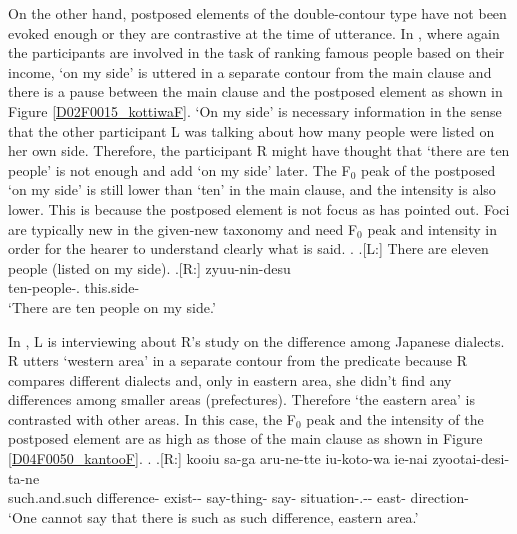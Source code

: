 On the other hand,
postposed elements of the double-contour type have not been evoked enough or they are contrastive at the time of utterance.
In \Next, where again the participants are involved in the task of ranking famous people based on their income,
 `on my side' is uttered in a separate contour from the main clause and there is a pause between the main clause and the postposed element as shown in Figure \ref{D02F0015_kottiwaF}.
`On my side' is necessary information in the sense that
the other participant L was talking about how many people were listed on her own side.
Therefore, the participant R might have thought that `there are ten people' is not enough and add `on my side' later.
The F$_{0}$ peak of the postposed  `on my side' is still lower than  `ten' in the main clause,
and the intensity is also lower.
This is because the postposed element is not focus as  has pointed out.
Foci are typically new in the given-new taxonomy and need F$_{0}$ peak and intensity in order for the hearer to understand clearly what is said.
%
\ex.\label{D02F0015_kottiwa}
 \a.[L:] There are eleven people (listed on my side).
 \bg.[R:] zyuu-nin-desu  \\
 		ten-people-. this.side- \\
		`There are ten people on my side.'


In \Next,
L is interviewing about R's study on the difference among Japanese dialects.
R utters `western area' in a separate contour from the predicate
because R compares different dialects and, only in eastern area, she didn't find any differences among smaller areas (prefectures).
Therefore `the eastern area' is contrasted with other areas.
In this case, the F$_{0}$ peak and the intensity of the postposed element are as high as those of the main clause
as shown in Figure \ref{D04F0050_kantooF}.
%
\ex.\label{D04F0050_kantoo}
 \ag.[R:] kooiu sa-ga aru-ne-tte iu-koto-wa ie-nai zyootai-desi-ta-ne   \\
 	such.and.such difference- exist-- say-thing- say- situation-.-- east- direction- \\
	`One cannot say that there is such as such difference, eastern area.'

